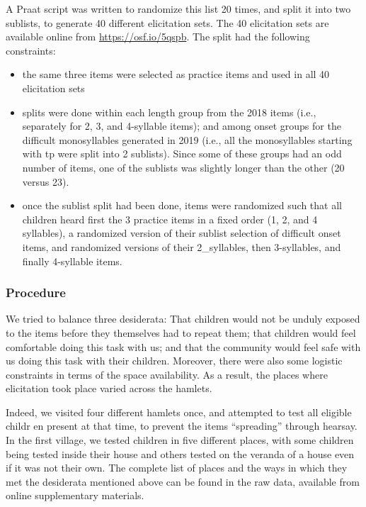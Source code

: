 \documentclass[english,,man,floatsintext]{apa6}
\providecommand{\tightlist}{%
  \setlength{\itemsep}{0pt}\setlength{\parskip}{0pt}}
\begin{document}
A Praat script was written to randomize this list 20 times, and split it into two sublists, to generate 40 different elicitation sets. The 40 elicitation sets are available online from \url{https://osf.io/5qspb}. The split had the following constraints:

\begin{itemize}
\tightlist
\item
  the same three items were selected as practice items and used in all 40 elicitation sets
\item
  splits were done within each length group from the 2018 items (i.e., separately for 2, 3, and 4-syllable items); and among onset groups for the difficult monosyllables generated in 2019 (i.e., all the monosyllables starting with tp were split into 2 sublists). Since some of these groups had an odd number of items, one of the sublists was slightly longer than the other (20 versus 23).
\item
  once the sublist split had been done, items were randomized such that all children heard first the 3 practice items in a fixed order (1, 2, and 4 syllables), a randomized version of their sublist selection of difficult onset items, and randomized versions of their 2\_syllables, then 3-syllables, and finally 4-syllable items.
\end{itemize}

\hypertarget{procedure}{%
\subsubsection{Procedure}\label{procedure}}

We tried to balance three desiderata: That children would not be unduly exposed to the items before they themselves had to repeat them; that children would feel comfortable doing this task with us; and that the community would feel safe with us doing this task with their children. Moreover, there were also some logistic constraints in terms of the space availability. As a result, the places where elicitation took place varied across the hamlets.

Indeed, we visited four different hamlets once, and attempted to test all eligible childr en present at that time, to prevent the items \enquote{spreading} through hearsay. In the first village, we tested children in five different places, with some children being tested inside their house and others tested on the veranda of a house even if it was not their own. The complete list of places and the ways in which they met the desiderata mentioned above can be found in the raw data, available from online supplementary materials.
\end{document}
